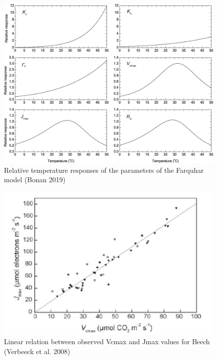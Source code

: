 \documentclass[12pt,oneside]{book}
\begin{document}
\begin{figure}

{\centering \includegraphics[width=0.8\linewidth]{figures/chap2/temp_responses} 

}

\caption{Relative temperature responses of the parameters of the Farquhar model (Bonan 2019)}\label{fig:f28bis}
\end{figure}

\begin{figure}

{\centering \includegraphics[width=0.8\linewidth]{figures/chap2/vcmax_jmax} 

}

\caption{Linear relation between observed Vcmax and Jmax values for Beech (Verbeeck et al. 2008)}\label{fig:f29}
\end{figure}
\end{document}
